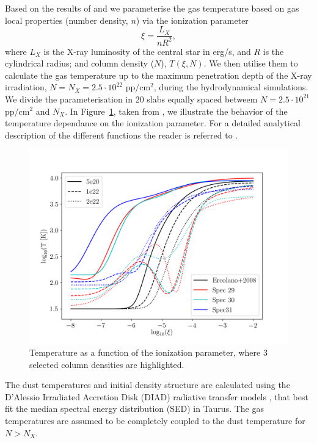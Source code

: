 \documentclass{aa}
\begin{document}
Based on the results of  and  we parameterise the gas temperature based on gas local properties (number density, $n$) via the ionization parameter
\begin{equation}
    \xi = \frac{L_X}{n R^2},
\end{equation}
where $L_X$ is the X-ray luminosity of the central star in erg/s, and $R$ is the cylindrical radius; and column density ($N$), $T(\xi,N)$.
We then utilise them to calculate the gas temperature up to the maximum penetration depth of the X-ray irradiation, $N = N_X = 2.5\cdot 10^{22}$ pp/cm$^2$, during the hydrodynamical simulations.
We divide the parameterisation in 20 slabs equally spaced betweem $N=2.5\cdot 10^{21}$ pp/cm$^2$ and $N_X$. In Figure~\ref{fig:tempxi}, taken from , we illustrate the behavior of the temperature dependance on the ionization parameter. For a detailed analytical description of the different functions the reader is referred to .

\begin{figure}
    \centering
    \includegraphics[width=.45\textwidth]{xite.png}
    \caption{Temperature as a function of the ionization parameter, where $3$ selected column densities are highlighted. \label{fig:tempxi}}
\end{figure}

The dust temperatures and initial density structure are calculated using the D’Alessio
Irradiated Accretion Disk (\textsc{DIAD}) radiative transfer models , that best fit the median spectral energy distribution (SED) in Taurus.
The gas temperatures are assumed to be completely coupled to the dust temperature for $N>N_X$.
\end{document}
